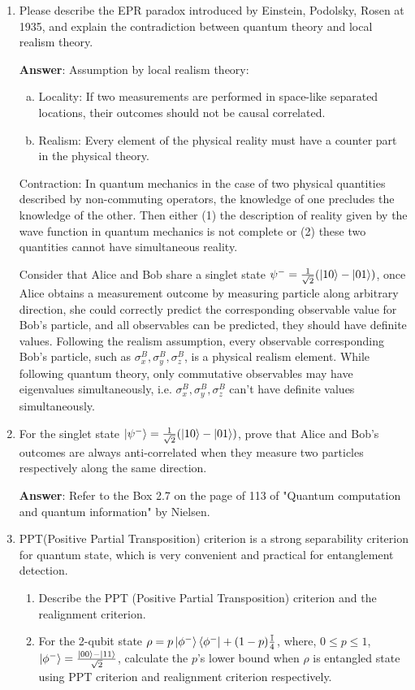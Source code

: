 \documentclass[english,aps,onecolumn]{revtex4-1}
\begin{document}
\begin{enumerate}[1.]
\item Please describe the EPR paradox introduced by Einstein, Podolsky, Rosen at 1935, and explain the contradiction between quantum theory and local realism theory.

\textbf{Answer}:
Assumption by local realism theory:
\begin{enumerate}[(a).]
	\item Locality: If two measurements are performed in space-like separated locations, their outcomes should not be causal correlated.
	\item Realism: Every element of the physical reality must have a counter part in the physical theory.
\end{enumerate}
Contraction: In quantum mechanics in the case of two physical quantities described by non-commuting operators, the knowledge of one precludes the knowledge of the other. Then either (1) the description of reality given by the wave function in quantum mechanics is not complete or (2) these two quantities cannot have simultaneous reality.

Consider that Alice and Bob share a singlet state $\psi^-=\frac{1}{\sqrt{2}}(\ket{10}-\ket{01})$, once Alice obtains a measurement outcome by measuring particle along arbitrary direction, she could correctly predict the corresponding  observable value for Bob's particle, and all observables can be predicted, they should have definite values. Following the realism assumption, every observable corresponding Bob's particle, such as $\sigma_x^B, \sigma_y^B, \sigma_z^B$, is a physical realism element. While following quantum theory, only commutative observables may have eigenvalues simultaneously, i.e. $\sigma_x^B, \sigma_y^B, \sigma_z^B$ can't have definite values simultaneously.

\item
For the  singlet state $\ket{\psi^{-}}=\frac{1}{\sqrt{2}}(\ket{10}-\ket{01})$, prove that  Alice and Bob's outcomes are always anti-correlated when they measure two particles respectively along the same direction.

\textbf{Answer}:
Refer to the Box 2.7 on the  page of 113 of "Quantum computation and quantum information" by Nielsen.


\item PPT(Positive Partial Transposition) criterion is a strong separability criterion for quantum state, which is very convenient and practical for entanglement detection.
	\begin{enumerate}[(1)]
	\item Describe the PPT (Positive Partial Transposition) criterion and the realignment criterion.
	\item For the 2-qubit state $\rho = p \ket{\phi^-}\bra{\phi^-} + (1-p) \frac{\mathbb{I}}{4}$, where, $0\leq p\leq1$, $\ket{\phi^-}=\frac{\ket{00}-\ket{11}}{\sqrt{2}}$, calculate the $p$'s lower bound when $\rho$ is entangled state using PPT criterion and realignment criterion respectively.
	\end{enumerate}


\end{enumerate}
\end{document}
